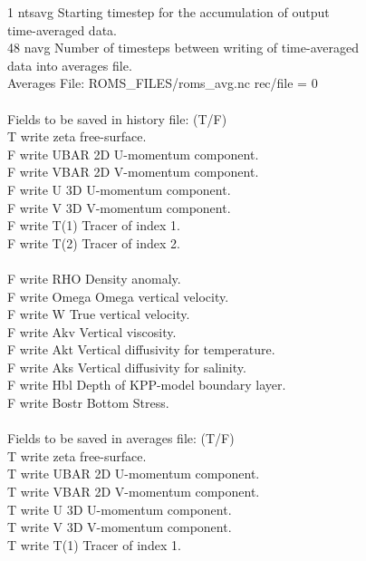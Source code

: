          1  ntsavg      Starting timestep for the accumulation of output\\
                                time-averaged data.\\
        48  navg        Number of timesteps between writing of time-averaged\\
                                data into averages file.\\
      Averages File:  ROMS\_FILES/roms\_avg.nc rec/file =  0\\
\\
 Fields to be saved in history file: (T/F)\\
      T  write zeta  free-surface.\\
      F  write UBAR  2D U-momentum component.\\
      F  write VBAR  2D V-momentum component.\\
      F  write U     3D U-momentum component.\\
      F  write V     3D V-momentum component.\\
      F  write T(1)  Tracer of index 1.\\
      F  write T(2)  Tracer of index 2.\\
\\
      F  write RHO   Density anomaly.\\
      F  write Omega Omega vertical velocity.\\
      F  write W     True vertical velocity.\\
      F  write Akv   Vertical viscosity.\\
      F  write Akt   Vertical diffusivity for temperature.\\
      F  write Aks   Vertical diffusivity for salinity.\\
      F  write Hbl   Depth of KPP-model boundary layer.\\
      F  write Bostr Bottom Stress.\\
\\
 Fields to be saved in averages file: (T/F)\\
      T  write zeta  free-surface.\\
      T  write UBAR  2D U-momentum component.\\
      T  write VBAR  2D V-momentum component.\\
      T  write U     3D U-momentum component.\\
      T  write V     3D V-momentum component.\\
      T  write T(1)  Tracer of index 1.\\
